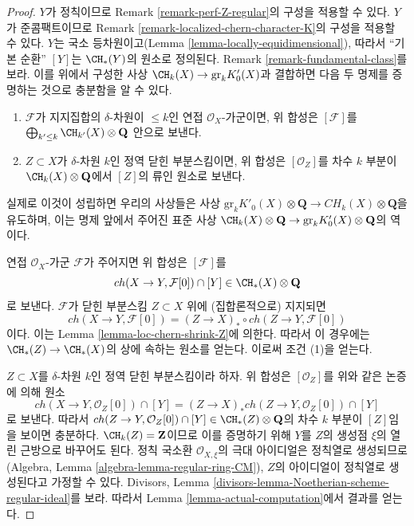 \begin{proof}
$Y$가 정칙이므로 Remark \ref{remark-perf-Z-regular}의 구성을 적용할 수
있다. $Y$가 준콤팩트이므로 Remark
\ref{remark-localized-chern-character-K}의 구성을 적용할 수 있다.
$Y$는 국소 등차원이고(Lemma \ref{lemma-locally-equidimensional}), 따라서
“기본 순환” $[Y]$는 $\CH_*(Y)$의 원소로 정의된다. Remark
\ref{remark-fundamental-class}를 보라. 이를 위에서 구성한 사상
$\CH_k(X) \to \text{gr}_kK'_0(X)$과 결합하면 다음 두 명제를 증명하는
것으로 충분함을 알 수 있다.
\begin{enumerate}
\item $\mathcal{F}$가 지지집합의 $\delta$-차원이 $\leq k$인 연접
$\mathcal{O}_X$-가군이면, 위 합성은 $[\mathcal{F}]$를
$\bigoplus_{k' \leq k} \CH_{k'}(X) \otimes \mathbf{Q}$ 안으로 보낸다.
\item $Z \subset X$가 $\delta$-차원 $k$인 정역 닫힌 부분스킴이면,
위 합성은 $[\mathcal{O}_Z]$를 차수 $k$ 부분이
$\CH_k(X) \otimes \mathbf{Q}$에서 $[Z]$의 류인 원소로 보낸다.
\end{enumerate}
실제로 이것이 성립하면 우리의 사상들은 사상
$\text{gr}_kK'_0(X) \otimes \mathbf{Q} \to CH_k(X) \otimes \mathbf{Q}$을
유도하며, 이는 명제 앞에서 주어진 표준 사상
$\CH_k(X) \otimes \mathbf{Q} \to \text{gr}_k K'_0(X) \otimes \mathbf{Q}$의
역이다.

\medskip\noindent
연접 $\mathcal{O}_X$-가군 $\mathcal{F}$가 주어지면 위 합성은
$[\mathcal{F}]$를
$$
ch(X \to Y, \mathcal{F}[0]) \cap [Y] \in \CH_*(X) \otimes \mathbf{Q}
$$
로 보낸다. $\mathcal{F}$가 닫힌 부분스킴 $Z \subset X$ 위에
(집합론적으로) 지지되면
$$
ch(X \to Y, \mathcal{F}[0]) = (Z \to X)_* \circ ch(Z \to Y, \mathcal{F}[0])
$$
이다. 이는 Lemma \ref{lemma-loc-chern-shrink-Z}에 의한다. 따라서 이
경우에는 $\CH_*(Z) \to \CH_*(X)$의 상에 속하는 원소를 얻는다. 이로써
조건 (1)을 얻는다.

\medskip\noindent
$Z \subset X$를 $\delta$-차원 $k$인 정역 닫힌 부분스킴이라 하자.
위 합성은 $[\mathcal{O}_Z]$를 위와 같은 논증에 의해 원소
$$
ch(X \to Y, \mathcal{O}_Z[0]) \cap [Y] =
(Z \to X)_* ch(Z \to Y, \mathcal{O}_Z[0]) \cap [Y]
$$
로 보낸다. 따라서
$ch(Z \to Y, \mathcal{O}_Z[0]) \cap [Y] \in
\CH_*(Z) \otimes \mathbf{Q}$의 차수 $k$ 부분이 $[Z]$임을 보이면
충분하다. $\CH_k(Z) = \mathbf{Z}$이므로 이를 증명하기 위해 $Y$를
$Z$의 생성점 $\xi$의 열린 근방으로 바꾸어도 된다. 정칙 국소환
$\mathcal{O}_{X, \xi}$의 극대 아이디얼은 정칙열로 생성되므로(Algebra,
Lemma \ref{algebra-lemma-regular-ring-CM}), $Z$의 아이디얼이 정칙열로
생성된다고 가정할 수 있다. Divisors, Lemma
\ref{divisors-lemma-Noetherian-scheme-regular-ideal}를 보라. 따라서 Lemma
\ref{lemma-actual-computation}에서 결과를 얻는다.
\end{proof}







